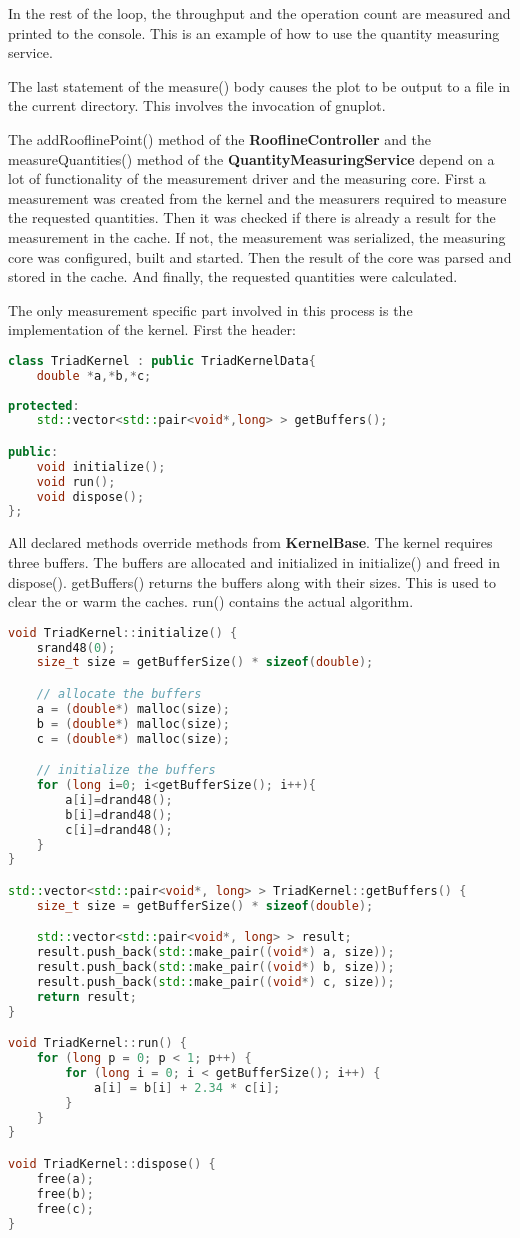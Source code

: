 \documentclass[a4paper,12pt]{report}
\newcommand{\class}[1]{\textbf{#1}}
\newcommand{\method}[1]{\textsf{#1}}
\begin{document}
In the rest of the loop, the throughput and the operation count are measured and
printed to the console. This is an example of how to use the quantity measuring
service.

The last statement of the measure() body causes the plot to be output to a file
in the current directory. This involves the invocation of gnuplot.

The \method{addRooflinePoint()} method of the \class{RooflineController} and the
\method{measureQuantities()} method of the \class{QuantityMeasuringService}
depend on a lot of functionality of the measurement driver and the measuring
core. First a measurement was created from the kernel and the measurers required
to measure the requested quantities. Then it was checked if there is already a
result for the measurement in the cache. If not, the measurement was serialized,
the measuring core was configured, built and started. Then the result of the
core was parsed and stored in the cache. And finally, the requested quantities
were calculated.

The only measurement specific part involved in this process is the
implementation of the kernel. First the header:

\begin{lstlisting}[language=C++]
class TriadKernel : public TriadKernelData{
	double *a,*b,*c;
	
protected:
	std::vector<std::pair<void*,long> > getBuffers();

public:
	void initialize();
	void run();
	void dispose();
};
\end{lstlisting}

All declared methods override methods
from \class{KernelBase}. The kernel requires three buffers.  The buffers are
allocated and initialized in initialize() and freed in dispose(). \method{getBuffers()} returns the buffers along with
their sizes. This is used to clear the or warm the caches. run() contains the
actual algorithm. 


\begin{lstlisting}[language=C++]
void TriadKernel::initialize() {
	srand48(0);
	size_t size = getBufferSize() * sizeof(double);

	// allocate the buffers
	a = (double*) malloc(size);
	b = (double*) malloc(size);
	c = (double*) malloc(size);

	// initialize the buffers
	for (long i=0; i<getBufferSize(); i++){
		a[i]=drand48();
		b[i]=drand48();
		c[i]=drand48();
	}
}

std::vector<std::pair<void*, long> > TriadKernel::getBuffers() {
	size_t size = getBufferSize() * sizeof(double);

	std::vector<std::pair<void*, long> > result;
	result.push_back(std::make_pair((void*) a, size));
	result.push_back(std::make_pair((void*) b, size));
	result.push_back(std::make_pair((void*) c, size));
	return result;
}

void TriadKernel::run() {
	for (long p = 0; p < 1; p++) {
		for (long i = 0; i < getBufferSize(); i++) {
			a[i] = b[i] + 2.34 * c[i];
		}
	}
}

void TriadKernel::dispose() {
	free(a);
	free(b);
	free(c);
}

\end{lstlisting}
\end{document}
